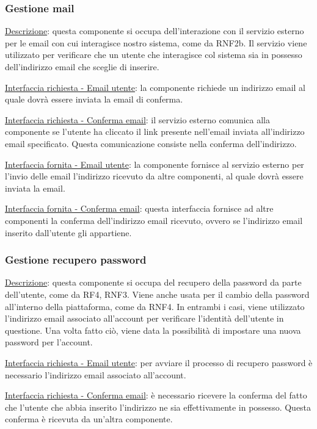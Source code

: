 \documentclass[a4paper,12pt]{article}
\begin{document}
\subsubsection{Gestione mail}

\underline{Descrizione}: questa componente si occupa dell’interazione con il servizio esterno per le email con cui interagisce nostro sistema, come da RNF2b. Il servizio viene utilizzato per verificare che un utente che interagisce col sistema sia in possesso dell’indirizzo email che sceglie di inserire.

\underline{Interfaccia richiesta - Email utente}: la componente richiede un indirizzo email al quale dovrà essere inviata la email di conferma.

\underline{Interfaccia richiesta - Conferma email}: il servizio esterno comunica alla componente se l’utente ha cliccato il link presente nell’email inviata all’indirizzo email specificato. Questa comunicazione consiste nella conferma dell’indirizzo.

\underline{Interfaccia fornita - Email utente}: la componente fornisce al servizio esterno per l’invio delle email l’indirizzo ricevuto da altre componenti, al quale dovrà essere inviata la email.

\underline{Interfaccia fornita - Conferma email}: questa interfaccia fornisce ad altre componenti la conferma dell’indirizzo email ricevuto, ovvero se l’indirizzo email inserito dall’utente gli appartiene.

\subsubsection{Gestione recupero password}

\underline{Descrizione}: questa componente si occupa del recupero della password da parte dell’utente, come da RF4, RNF3. Viene anche usata per il cambio della password all’interno della piattaforma, come da RNF4. In entrambi i casi, viene utilizzato l’indirizzo email associato all’account per verificare l’identità dell’utente in questione. Una volta fatto ciò, viene data la possibilità di impostare una nuova password per l’account.


\underline{Interfaccia richiesta - Email utente}: per avviare il processo di recupero password è necessario l’indirizzo email associato all’account.

\underline{Interfaccia richiesta - Conferma email}: è necessario ricevere la conferma del fatto che l’utente che abbia inserito l’indirizzo ne sia effettivamente in possesso. Questa conferma è ricevuta da un’altra componente.
\end{document}
